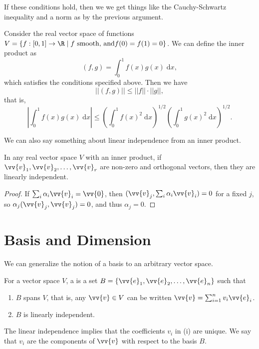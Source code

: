 If these conditions hold, then we we get things like the Cauchy-Schwartz inequality and a norm as by the previous argument.

\begin{example}
    Consider the real vector space of functions $V = \{ f: [0, 1] \rightarrow \R \mid f \text{ smooth, and} f(0) = f(1) = 0 \}$.
    We can define the inner product as
    $$
    (f, g) = \int_0^1 f(x)g(x) \; \mathrm{d}x,
    $$
    which satisfies the conditions specified above. Then we have
    $$
    ||(f, g)|| \leq ||f|| \cdot ||g||,
    $$
    that is,
    $$
    \left| \int_0^1 f(x)g(x)\; \mathrm{d}x \right| \leq \left(\int_0^1 f(x)^2\; \mathrm{d}x\right)^{1/2} \left(\int_0^1 g(x)^2\; \mathrm{d}x\right)^{1/2}.
    $$
\end{example}

We can also say something about linear independence from an inner product.

\begin{lemma}
In any real vector space $V$ with an inner product, if $\vv{v}_1, \vv{v}_2, \dots, \vv{v}_r$ are non-zero and orthogonal vectors, then they are linearly independent.
\end{lemma}
\begin{proof}
    If $\sum_i \alpha_i \vv{v}_i = \vv{0}$, then $(\vv{v}_j, \sum_i \alpha_i \vv{v}_i) = 0$ for a fixed $j$, so $\alpha_j (\vv{v}_j, \vv{v}_j) = 0$, and thus $\alpha_j = 0$.
\end{proof}

\section{Basis and Dimension}

We can generalize the notion of a basis to an arbitrary vector space.

\begin{definition}[Basis]
    For a vector space $V$, a  is a set $B = \{\vv{e}_1, \vv{e}_2, \dots, \vv{e}_n \}$ such that
    \begin{enumerate}[label=(\roman*)]
        \item $B$ spans $V$, that is, any $\vv{v} \in V$ can be written $\vv{v} = \sum_{i = 1}^n v_i \vv{e}_i$.
        \item $B$ is linearly independent.
    \end{enumerate}
\end{definition}

The linear independence implies that the coefficients $v_i$ in (i) are unique. We say that $v_i$ are the components of $\vv{v}$ with respect to the basis $B$.


